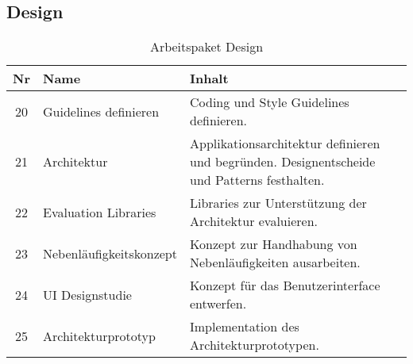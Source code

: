 \subsection{Design}
\begin{table}[H]
\begin{tabularx}{\textwidth}{ c | l | X }
\textbf{Nr} & \textbf{Name} & \textbf{Inhalt} \\ \hline
20 & Guidelines definieren & Coding und Style Guidelines definieren.\\ \hline
21 & Architektur & Applikationsarchitektur definieren und begründen. Designentscheide und Patterns festhalten.\\ \hline
22 & Evaluation Libraries & Libraries zur Unterstützung der Architektur evaluieren.\\ \hline
23 & Nebenläufigkeitskonzept & Konzept zur Handhabung von Nebenläufigkeiten ausarbeiten.\\ \hline
24 & UI Designstudie & Konzept für das Benutzerinterface entwerfen.\\ \hline
25 & Architekturprototyp & Implementation des Architekturprototypen.\\ \hline
\end{tabularx}
\caption{Arbeitspaket Design}
\end{table}